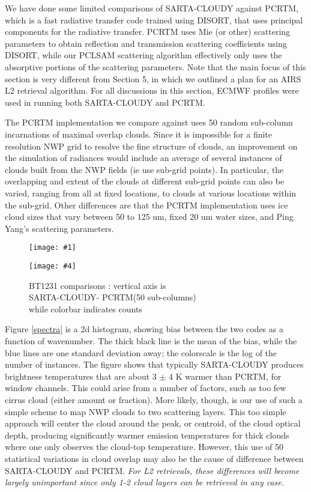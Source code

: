 \documentclass[11pt]{article}
\newcommand{\sasc}{\textsf{SARTA-CLOUDY}\xspace}
\newcommand{\pcrtm}{\textsf{PCRTM}\xspace}
\newcommand{\disort}{\textsf{DISORT}\xspace}
\newcommand{\ecmwf}{\textsf{ECMWF}\xspace}
\newcommand{\dfigure}[6]
{
\begin{figure}
  \begin{minipage}[t]{0.47\textwidth}
  \centering
  \texttt{[image: \#1]}
   \caption{#2}  \label{#3}
  \end{minipage}
  \hfil
  \begin{minipage}[t]{0.47\linewidth}
  \centering
  \texttt{[image: \#4]}
   \caption{#5}  \label{#6}
  \end{minipage}
\end{figure}
}
\begin{document}
We have done some limited comparisons of \sasc against \pcrtm,\cite{liu:06,liu:09*2}
which is a fast radiative transfer code trained using \disort, that
uses principal components for the radiative transfer. \pcrtm uses 
Mie (or other) scattering parameters to obtain reflection and transmission 
scattering coefficients using \disort, while our \textsf{PCLSAM} scattering algorithm
effectively only uses the absorptive portions of the scattering parameters. 
Note that the main focus of this section is very different from Section
5, in which we outlined a plan for an AIRS L2 retrieval algorithm.
For all discussions in this section, \ecmwf profiles were used in running
both \sasc and \pcrtm.

The \pcrtm implementation we compare against uses 50 random sub-column
incarnations of maximal overlap clouds. Since it is impossible for a
finite resolution NWP grid to resolve the fine structure of clouds, an
improvement on the simulation of radiances would include an average of
several instances of clouds built from the NWP fields (ie use sub-grid
points). In particular, the overlapping and extent of the clouds at
different sub-grid points can also be varied, ranging from all at fixed
locations, to clouds at various locations within the sub-grid.  Other
differences are that the \pcrtm implementation uses ice cloud sizes
that vary between 50 to 125 um, fixed 20 um water sizes, and Ping
Yang's scattering parameters.

\dfigure{Figs/spectra_sartaVSpcrtm.jpg}{Bias between two scattering codes \\
  \sasc - \pcrtm (50 sub-columns)}{spectra}{Figs/pcrtm_calc_vs_sarta_biasV1}{BT1231
  comparisons : vertical axis is \\ \sasc - \pcrtm (50 sub-columns) \\
  while colorbar indicates counts}{bt1231_sarta_pcrtm}

Figure \ref{spectra} is a 2d histogram, showing bias between the two
codes as a function of wavenumber. The thick black line is the mean of
the bias, while the blue lines are one standard deviation away; the
colorscale is the log of the number of instances. The figure shows
that typically \sasc produces brightness temperatures that are about 3
$\pm$ 4 K warmer than \pcrtm, for window channels. This could arise
from a number of factors, such as too few cirrus cloud (either
amount or fraction). More likely, though, is our use of such a simple
scheme to map NWP clouds to two scattering layers.  This too simple
approach will center the cloud around the peak, or centroid, of the
cloud optical depth, producing significantly warmer emission
temperatures for thick clouds where one only observes the cloud-top
temperature. However, this use of 50 statistical variations in cloud
overlap may also be the cause of difference between \sasc and \pcrtm.
\emph{For L2 retrievals, these differences will become largely
  unimportant since only 1-2 cloud layers can be retrieved in any case.}
\end{document}

